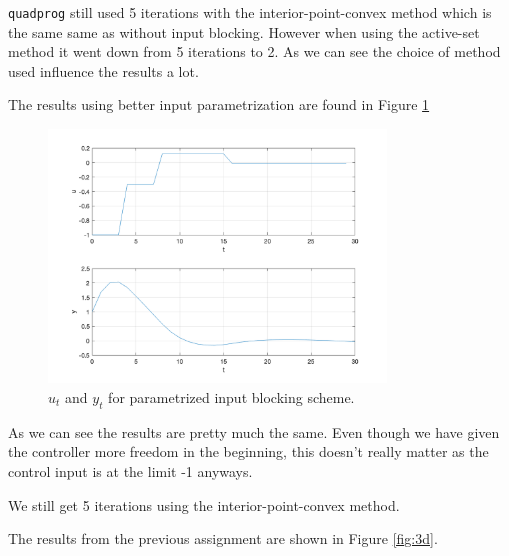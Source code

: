 \documentclass[11pt, a4paper, english]{NTNUoving}
\begin{document}
\begin{oppgave}
\begin{punkt}
        \texttt{quadprog} still used 5 iterations with the interior-point-convex method which is the same same as
        without input blocking. However when using the active-set method it went down from 5 iterations to 2. As we can see
        the choice of method used influence the results a lot.
    \end{punkt}

    \begin{punkt}
        The results using better input parametrization are found in Figure \ref{fig:3c}
        \begin{figure}[H]
            \centering
            \includegraphics[width=0.8\textwidth]{../3c.png}
            \caption{$u_t$ and $y_t$ for parametrized input blocking scheme.}
            \label{fig:3c}
        \end{figure}

        As we can see the results are pretty much the same. Even though we have given the controller
        more freedom in the beginning, this doesn't really matter as the control input is at the limit -1 anyways.

        We still get 5 iterations using the interior-point-convex method.

    \end{punkt}

    \begin{punkt}
        The results from the previous assignment are shown in Figure \ref{fig:3d}.


\end{punkt}
\end{oppgave}
\end{document}
